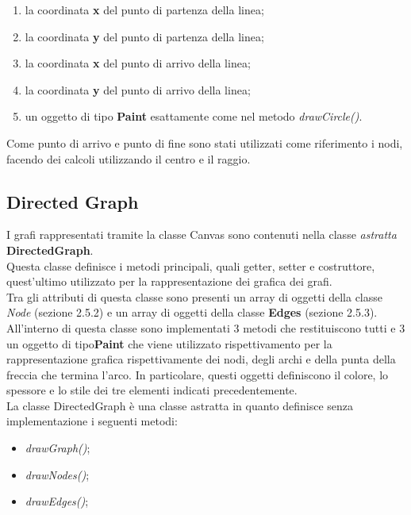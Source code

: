 \documentclass[a4paper,11pt,twoside,openright]{report}
\begin{document}
\begin{enumerate}
\item la coordinata \textbf{x} del punto di partenza della linea;

\item la coordinata \textbf{y} del punto di partenza della linea;

\item la coordinata \textbf{x} del punto di arrivo della linea;

\item la coordinata \textbf{y} del punto di arrivo della linea;

\item un oggetto di tipo \textbf{Paint} esattamente come nel metodo \textit{drawCircle()}.
\end{enumerate}

Come punto di arrivo e punto di fine sono stati utilizzati come riferimento i nodi, facendo dei calcoli utilizzando il centro e il raggio.

\subsection{Directed Graph}
I grafi rappresentati tramite la classe Canvas sono contenuti nella classe \textit{astratta} \textbf{DirectedGraph}.\\
Questa classe definisce i metodi principali, quali getter, setter e costruttore, quest'ultimo utilizzato per la rappresentazione dei grafica dei grafi.\\
Tra gli attributi di questa classe sono presenti un array di oggetti della classe \textit{Node} (sezione 2.5.2)  e un array di oggetti della classe \textbf{Edges} (sezione 2.5.3).
All'interno di questa classe sono implementati 3 metodi che restituiscono tutti e 3 un oggetto di tipo\textbf{Paint} che viene utilizzato rispettivamento per la rappresentazione grafica rispettivamente dei nodi, degli archi e della punta della freccia che termina l'arco. In particolare, questi oggetti definiscono il colore, lo spessore e lo stile dei tre elementi indicati precedentemente.\\
La classe DirectedGraph è una classe astratta in quanto definisce senza implementazione i seguenti metodi:

\begin{itemize}
\item \textit{drawGraph()};

\item \textit{drawNodes()};

\item \textit{drawEdges()};
\end{itemize}
\end{document}
